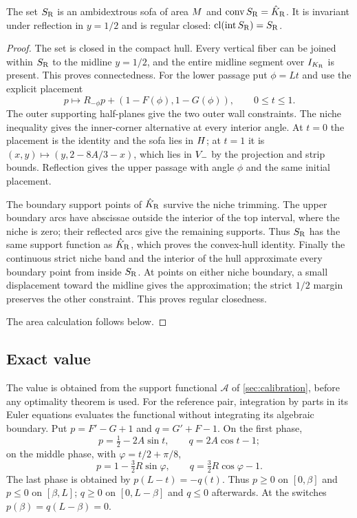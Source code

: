 \begin{theorem}\label{thm:reference}
The set $S_{\mathrm R}$ is an ambidextrous sofa of area $M$ and
$\operatorname{conv}S_{\mathrm R}=\hat K_{\mathrm R}$. It is invariant under reflection in $y=1/2$ and
is regular closed: $\operatorname{cl}(\operatorname{int}S_{\mathrm R})=S_{\mathrm R}$.
\end{theorem}
\begin{proof}
The set is closed in the compact hull. Every vertical fiber can be
joined within $S_{\mathrm R}$ to the midline $y=1/2$, and the entire midline
segment over $I_{K_{\mathrm R}}$ is present. This proves connectedness.
For the lower passage put $\phi=Lt$ and use the explicit placement
\begin{equation}\label{eq:reference-motion}
 p\longmapsto R_{-\phi}p+(1-F(\phi),1-G(\phi)),\qquad 0\le t\le1.
\end{equation}
The outer supporting half-planes give the two outer wall constraints.
The niche inequality gives the inner-corner alternative at every
interior angle. At $t=0$ the placement is the identity and the sofa
lies in $H$; at $t=1$ it is
$(x,y)\mapsto(y,2-8A/3-x)$, which lies in $V_-$ by the projection
and strip bounds. Reflection gives the upper passage with angle
$\phi$ and the same initial placement.

The boundary support points of $\hat K_{\mathrm R}$ survive the niche trimming.
The upper boundary arcs have abscissae outside the interior of the
top interval, where the niche is zero; their reflected arcs give
the remaining supports. Thus $S_{\mathrm R}$ has the same
support function as $\hat K_{\mathrm R}$, which proves the convex-hull identity.
Finally the continuous strict niche band and the interior of the
hull approximate every boundary point from inside $S_{\mathrm R}$. At points
on either niche boundary, a small displacement toward the midline
gives the approximation; the strict $1/2$ margin preserves the other
constraint. This proves regular closedness.

The area calculation follows below.
\end{proof}

\subsection{Exact value}
The value is obtained from the support functional $\mathcal A$
of \cref{sec:calibration}, before any optimality theorem is used.
For the reference pair, integration by parts in its Euler equations
evaluates the functional without integrating its algebraic boundary.
Put $p=F'-G+1$ and $q=G'+F-1$. On the first phase,
\[
 p=\tfrac12-2A\sin t,\qquad q=2A\cos t-1;
\]
on the middle phase, with $\varphi=t/2+\pi/8$,
\[
 p=1-\tfrac32R\sin\varphi,\qquad
 q=\tfrac32R\cos\varphi-1.
\]
The last phase is obtained by $p(L-t)=-q(t)$.
Thus $p\ge0$ on $[0,\beta]$ and $p\le0$ on $[\beta,L]$;
$q\ge0$ on $[0,L-\beta]$ and $q\le0$ afterwards.
At the switches $p(\beta)=q(L-\beta)=0$.


